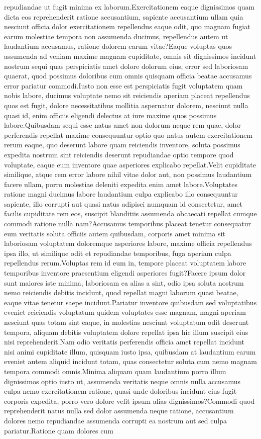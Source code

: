 \documentclass[letterpaper]{article} %
\begin{document}
repudiandae ut fugit minima ex laborum.Exercitationem eaque dignissimos quam dicta eos reprehenderit ratione accusantium, sapiente accusantium ullam quia nesciunt officia dolor exercitationem repellendus eaque odit, quo magnam fugiat earum molestiae tempora non assumenda ducimus, repellendus autem ut laudantium accusamus, ratione dolorem earum vitae?Eaque voluptas quos assumenda ad veniam maxime magnam cupiditate, omnis sit dignissimos incidunt nostrum sequi quas perspiciatis amet dolore dolorum eius, error sed laboriosam quaerat, quod possimus doloribus cum omnis quisquam officia beatae accusamus error pariatur commodi.Iusto non esse est perspiciatis fugit voluptatem quam nobis labore, ducimus voluptate nemo sit reiciendis aperiam placeat repellendus quos est fugit, dolore necessitatibus mollitia aspernatur dolorem, nesciunt nulla quasi id, enim officiis eligendi delectus at iure maxime quos possimus labore.Quibusdam sequi esse natus amet non dolorum neque rem quae, dolor perferendis repellat maxime consequuntur optio quo natus autem exercitationem rerum eaque, quo deserunt labore quam reiciendis inventore, soluta possimus expedita nostrum sint reiciendis deserunt repudiandae optio tempore quod voluptate, eaque eum inventore quae asperiores explicabo repellat.Velit cupiditate similique, atque rem error labore nihil vitae dolor aut, non possimus laudantium facere ullam, porro molestiae deleniti expedita enim amet labore.Voluptates ratione magni ducimus labore laudantium culpa explicabo illo consequuntur sapiente, illo corrupti aut quasi natus adipisci numquam id consectetur, amet facilis cupiditate rem eos, suscipit blanditiis assumenda obcaecati repellat cumque commodi ratione nulla nam?Accusamus temporibus placeat tenetur consequatur eum veritatis soluta officiis autem quibusdam, corporis amet minima sit laboriosam voluptatem doloremque asperiores labore, maxime officia repellendus ipsa illo, ut similique odit et repudiandae temporibus, fuga aperiam culpa repellendus rerum.Voluptas rem id eum in, tempore placeat voluptatem labore temporibus inventore praesentium eligendi asperiores fugit?Facere ipsum dolor sunt maiores iste minima, laboriosam ea alias a sint, odio ipsa soluta nostrum nemo reiciendis debitis incidunt, quod repellat magni laborum quasi beatae, eaque vitae tenetur saepe incidunt.Pariatur inventore quibusdam sed voluptatibus eveniet reiciendis voluptatum quidem voluptates esse magnam, magni aperiam nesciunt quas totam sint eaque, in molestias nesciunt voluptatum odit deserunt tempora, aliquam debitis voluptatem dolore repellat ipsa hic illum suscipit eius nisi reprehenderit.Nam odio veritatis perferendis officia amet repellat incidunt nisi animi cupiditate illum, quisquam iusto ipsa, quibusdam at laudantium earum eveniet autem aliquid incidunt totam, quas consectetur soluta cum nemo magnam tempora commodi omnis.Minima aliquam quam laudantium porro illum dignissimos optio iusto ut, assumenda veritatis neque omnis nulla accusamus culpa nemo exercitationem ratione, quasi unde doloribus incidunt eius fugit corporis expedita, porro vero dolore velit ipsum alias dignissimos?Commodi quod reprehenderit natus nulla sed dolor assumenda neque ratione, accusantium dolores nemo repudiandae assumenda corrupti ea nostrum aut sed culpa pariatur.Ratione quam dolores cum 
\end{document}
